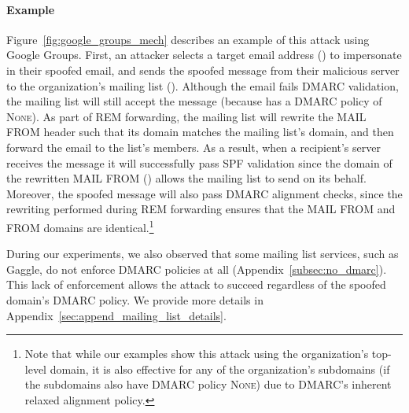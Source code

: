 \paragraph{Example}
Figure~\ref{fig:google_groups_mech} describes an example of this attack
using Google Groups.
First, an attacker selects a target email address () to impersonate in their spoofed email,
and sends the spoofed message from their malicious server to the organization's mailing list ().
Although the email fails DMARC validation,
the mailing list will still accept the message (because 
has a DMARC policy of \textsc{None}).
As part of REM forwarding, the mailing list will rewrite the
\textsc{MAIL FROM} header such that its domain matches the mailing
list's domain, and then forward the email to the list's members.
As a result, when a recipient's server receives the message it will
successfully pass SPF validation since the domain of the rewritten
\textsc{MAIL FROM} () allows the mailing list to send on
its behalf.
Moreover, the spoofed message will also pass DMARC alignment checks,
since the rewriting performed during REM forwarding
ensures that the \textsc{MAIL FROM} and \textsc{FROM} domains are
identical.\footnote{Note that while our examples show this attack
using the organization's top-level domain, it is also effective for
any of the organization's subdomains (if the subdomains also have
DMARC policy \textsc{None}) due to DMARC's inherent relaxed alignment policy.}

During our experiments, we also observed that some mailing list
services, such as Gaggle, do not enforce DMARC policies at all
(Appendix~\ref{subsec:no_dmarc}).
This lack of enforcement allows the attack to succeed regardless of the spoofed domain's DMARC policy.
We provide more details in Appendix~\ref{sec:append_mailing_list_details}.




